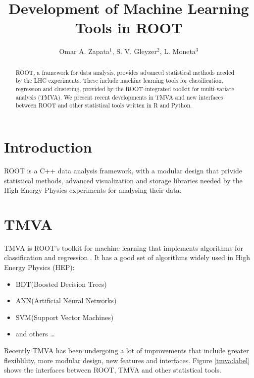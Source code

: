 \documentclass[a4paper]{jpconf}
\begin{document}
\title{Development of Machine Learning Tools in ROOT}

\author{Omar A. Zapata$^1$, S. V. Gleyzer$^2$, L. Moneta$^3$}

\address{$^1$,University of Antioquia and Metropolitan Institute of Technology.}
\address{$^2$,University of Florida and CERN.}
\address{$^3$,CERN.}


\begin{abstract}
ROOT, a framework for data analysis, provides advanced statistical methods needed by the LHC experiments.
These include machine learning tools for classification, regression and clustering, provided by the ROOT-integrated toolkit for multi-variate analysis (TMVA). 
We present recent developments in TMVA and new interfaces between ROOT and other statistical tools written in R and Python.
\end{abstract}

\section{Introduction}
ROOT  is  a C++ data analysis framework\cite{Antcheva20092499}, 
with a modular design that privide statistical methods, advanced visualization and storage libraries 
needed by the High Energy Physics experiments for analysing their data.

\section{TMVA}
TMVA is ROOT's toolkit for machine learning that implements algorithms for
classification and regression\cite{Hocker:2007ht} .
It has a good set of algorithms widely used in High Energy Physics (HEP):
\begin{itemize}  
\item BDT(Boosted Decision Trees)
\item ANN(Artificial Neural Networks)
\item SVM(Support Vector Machines)
\item and others \ldots 
\end{itemize}
Recently TMVA has  been undergoing a lot of improvements that include greater flexiblility, more modular design, new features and interfaces.
Figure \ref{tmva:label} shows the interfaces between ROOT, TMVA and other statistical tools.
\end{document}
